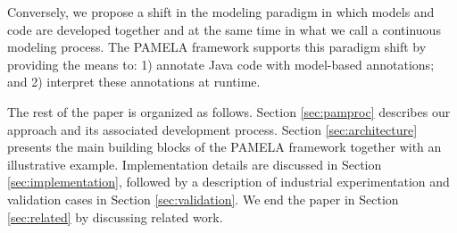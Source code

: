Conversely, we propose a shift in the modeling paradigm in which models and code are developed together and at the same time in what we call a continuous modeling process. The PAMELA framework supports this paradigm shift by providing the means to: 1) annotate Java code with model-based annotations; and 2) interpret these annotations at runtime.


The rest of the paper is organized as follows. Section \ref{sec:pamproc} describes our approach and its associated development process. Section \ref{sec:architecture} presents the main building blocks of the PAMELA framework together with an illustrative example. Implementation details are discussed in Section \ref{sec:implementation}, followed by a description of industrial experimentation and validation cases in Section \ref{sec:validation}. We end the paper in Section \ref{sec:related} by discussing related work.
